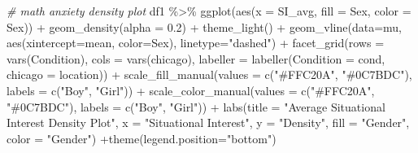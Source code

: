 \documentclass[
  letterpaper,
  DIV=11,
  numbers=noendperiod]{scrartcl}
\newenvironment{Shaded}{\begin{snugshade}}{\end{snugshade}}
\newcommand{\AttributeTok}[1]{\textcolor[rgb]{0.49,0.56,0.16}{#1}}
\newcommand{\CommentTok}[1]{\textcolor[rgb]{0.38,0.63,0.69}{\textit{#1}}}
\newcommand{\FloatTok}[1]{\textcolor[rgb]{0.25,0.63,0.44}{#1}}
\newcommand{\FunctionTok}[1]{\textcolor[rgb]{0.02,0.16,0.49}{#1}}
\newcommand{\NormalTok}[1]{\textcolor[rgb]{0.00,0.44,0.13}{#1}}
\newcommand{\SpecialCharTok}[1]{\textcolor[rgb]{0.25,0.44,0.63}{#1}}
\newcommand{\StringTok}[1]{\textcolor[rgb]{0.25,0.44,0.63}{#1}}
\begin{document}
\begin{Shaded}
\begin{Highlighting}[]
\CommentTok{\# math anxiety density plot}
\NormalTok{df1 }\SpecialCharTok{\%\textgreater{}\%} \FunctionTok{ggplot}\NormalTok{(}\FunctionTok{aes}\NormalTok{(}\AttributeTok{x =}\NormalTok{ SI\_avg, }\AttributeTok{fill =}\NormalTok{ Sex,}
                   \AttributeTok{color =}\NormalTok{ Sex)) }\SpecialCharTok{+}
  \FunctionTok{geom\_density}\NormalTok{(}\AttributeTok{alpha =} \FloatTok{0.2}\NormalTok{) }\SpecialCharTok{+}
  \FunctionTok{theme\_light}\NormalTok{() }\SpecialCharTok{+}
  \FunctionTok{geom\_vline}\NormalTok{(}\AttributeTok{data=}\NormalTok{mu, }\FunctionTok{aes}\NormalTok{(}\AttributeTok{xintercept=}\NormalTok{mean, }\AttributeTok{color=}\NormalTok{Sex),}
           \AttributeTok{linetype=}\StringTok{"dashed"}\NormalTok{) }\SpecialCharTok{+}
  \FunctionTok{facet\_grid}\NormalTok{(}\AttributeTok{rows =} \FunctionTok{vars}\NormalTok{(Condition),}
             \AttributeTok{cols =} \FunctionTok{vars}\NormalTok{(chicago),}
             \AttributeTok{labeller =} \FunctionTok{labeller}\NormalTok{(}\AttributeTok{Condition =}\NormalTok{ cond,}
                                 \AttributeTok{chicago =}\NormalTok{ location)) }\SpecialCharTok{+}
  \FunctionTok{scale\_fill\_manual}\NormalTok{(}\AttributeTok{values =} \FunctionTok{c}\NormalTok{(}\StringTok{"\#FFC20A"}\NormalTok{, }\StringTok{"\#0C7BDC"}\NormalTok{), }\AttributeTok{labels =} \FunctionTok{c}\NormalTok{(}\StringTok{"Boy"}\NormalTok{, }\StringTok{"Girl"}\NormalTok{)) }\SpecialCharTok{+}
  \FunctionTok{scale\_color\_manual}\NormalTok{(}\AttributeTok{values =} \FunctionTok{c}\NormalTok{(}\StringTok{"\#FFC20A"}\NormalTok{, }\StringTok{"\#0C7BDC"}\NormalTok{), }\AttributeTok{labels =} \FunctionTok{c}\NormalTok{(}\StringTok{"Boy"}\NormalTok{, }\StringTok{"Girl"}\NormalTok{)) }\SpecialCharTok{+}
  \FunctionTok{labs}\NormalTok{(}\AttributeTok{title =} \StringTok{"Average Situational Interest Density Plot"}\NormalTok{,}
    \AttributeTok{x =} \StringTok{"Situational Interest"}\NormalTok{, }\AttributeTok{y =} \StringTok{"Density"}\NormalTok{,}
       \AttributeTok{fill =} \StringTok{"Gender"}\NormalTok{, }\AttributeTok{color =} \StringTok{"Gender"}\NormalTok{) }\SpecialCharTok{+}\FunctionTok{theme}\NormalTok{(}\AttributeTok{legend.position=}\StringTok{"bottom"}\NormalTok{)}
\end{Highlighting}
\end{Shaded}
\end{document}
